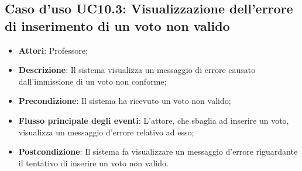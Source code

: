 \subsection{Caso d'uso \texorpdfstring{UC10.3}{UC10.3}: Visualizzazione dell'errore di inserimento di un voto non valido}
\begin{itemize}
	\item \textbf{Attori}: Professore;
	\item \textbf{Descrizione}: Il sistema visualizza un messaggio di errore causato dall'immissione di un voto non conforme;
	\item \textbf{Precondizione}: Il sistema ha ricevuto un voto non valido;
	
	\item \textbf{Flusso principale degli eventi}: L'attore, che sbaglia ad inserire un voto, visualizza un messaggio d'errore relativo ad esso;
	\item \textbf{Postcondizione}: Il sistema fa visualizzare un messaggio d'errore riguardante il tentativo di inserire un voto non valido.
\end{itemize}
